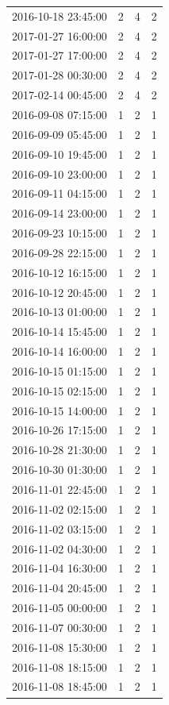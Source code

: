 \begin{tabular}{lrrr}
2016-10-18 23:45:00 & 2 & 4 & 2 \\
2017-01-27 16:00:00 & 2 & 4 & 2 \\
2017-01-27 17:00:00 & 2 & 4 & 2 \\
2017-01-28 00:30:00 & 2 & 4 & 2 \\
2017-02-14 00:45:00 & 2 & 4 & 2 \\
2016-09-08 07:15:00 & 1 & 2 & 1 \\
2016-09-09 05:45:00 & 1 & 2 & 1 \\
2016-09-10 19:45:00 & 1 & 2 & 1 \\
2016-09-10 23:00:00 & 1 & 2 & 1 \\
2016-09-11 04:15:00 & 1 & 2 & 1 \\
2016-09-14 23:00:00 & 1 & 2 & 1 \\
2016-09-23 10:15:00 & 1 & 2 & 1 \\
2016-09-28 22:15:00 & 1 & 2 & 1 \\
2016-10-12 16:15:00 & 1 & 2 & 1 \\
2016-10-12 20:45:00 & 1 & 2 & 1 \\
2016-10-13 01:00:00 & 1 & 2 & 1 \\
2016-10-14 15:45:00 & 1 & 2 & 1 \\
2016-10-14 16:00:00 & 1 & 2 & 1 \\
2016-10-15 01:15:00 & 1 & 2 & 1 \\
2016-10-15 02:15:00 & 1 & 2 & 1 \\
2016-10-15 14:00:00 & 1 & 2 & 1 \\
2016-10-26 17:15:00 & 1 & 2 & 1 \\
2016-10-28 21:30:00 & 1 & 2 & 1 \\
2016-10-30 01:30:00 & 1 & 2 & 1 \\
2016-11-01 22:45:00 & 1 & 2 & 1 \\
2016-11-02 02:15:00 & 1 & 2 & 1 \\
2016-11-02 03:15:00 & 1 & 2 & 1 \\
2016-11-02 04:30:00 & 1 & 2 & 1 \\
2016-11-04 16:30:00 & 1 & 2 & 1 \\
2016-11-04 20:45:00 & 1 & 2 & 1 \\
2016-11-05 00:00:00 & 1 & 2 & 1 \\
2016-11-07 00:30:00 & 1 & 2 & 1 \\
2016-11-08 15:30:00 & 1 & 2 & 1 \\
2016-11-08 18:15:00 & 1 & 2 & 1 \\
2016-11-08 18:45:00 & 1 & 2 & 1 \\

\end{tabular}
